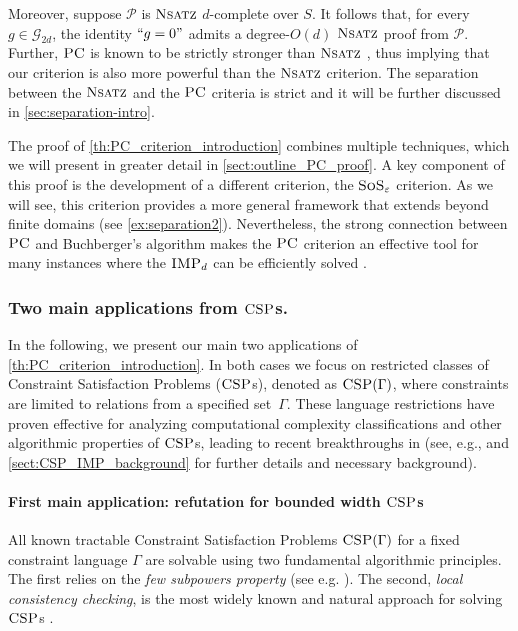 \documentclass[11pt]{article}
\newcommand{\sos}{\text{\sc{SoS}}}
\newcommand{\CSP}{\textsc{CSP}}
\newcommand{\IMP}{\textsc{IMP}}
\newcommand{\PC}{\textsc{PC}}
\newcommand{\Nsatz}{\textsc{Nsatz}}
\newcommand{\1}{\textbf{1}}
\begin{document}
Moreover, suppose $\mathcal{P}$ is $\Nsatz$ $d$-complete over $S$. It follows that, for every $g \in \mathcal{G}_{2d}$, the identity $``g=0"$ admits a degree-$O(d)$ $\Nsatz$ proof from $\mathcal{P}$. Further, $\PC$ is known to be strictly stronger than $\Nsatz$ \cite{CleggEI96}, thus implying that our criterion is also more powerful than the $\Nsatz$ criterion.
The separation between the $\Nsatz$ and the $\PC$ criteria is strict and it will be further discussed in \cref{sec:separation-intro}.

The proof of \cref{th:PC_criterion_introduction} combines multiple techniques, which we will present in greater detail in \cref{sect:outline_PC_proof}. A key component of this proof is the development of a different criterion, the $\sos_\varepsilon$ criterion. As we will see, this criterion provides a more general framework that extends beyond finite domains (see \cref{ex:separation2}). Nevertheless, the strong connection between $\PC$ and Buchberger's algorithm makes the $\PC$ criterion an effective tool for many instances where the $\IMP_d$ can be efficiently solved \cite{Cox}.

\subsubsection*{Two main applications from $\CSP$s.}
In the following, we present our main two applications of \cref{th:PC_criterion_introduction}.
In both cases we focus on restricted classes of Constraint Satisfaction Problems (\(\CSP\)s), denoted as \(\CSP(\Gamma)\), where constraints are limited to relations from a specified set~\(\Gamma\). These language restrictions have proven effective for analyzing computational complexity classifications and other algorithmic properties of $\CSP$s, leading to recent breakthroughs in \cite{Bulatov17,Zhuk17,Zhuk20} (see, e.g., \cite{barto_et_al:DFU:2017:6959,2017dfu7,Chen09} and \cref{sect:CSP_IMP_background} for further details and necessary background).

\paragraph{First main application: refutation for bounded width $\CSP$s}
All known tractable Constraint Satisfaction Problems $\CSP(\Gamma)$ for a fixed constraint language $\Gamma$  are solvable using two fundamental algorithmic principles. The first relies on the \emph{few subpowers property} (see e.g. \cite{barto_et_al:DFU:2017:6959}). The second, \emph{local consistency checking}, is the most widely known and natural approach for solving $\CSP$s \cite{BartoK14,barto_et_al:DFU:2017:6959,Bulatov17}.
\end{document}
